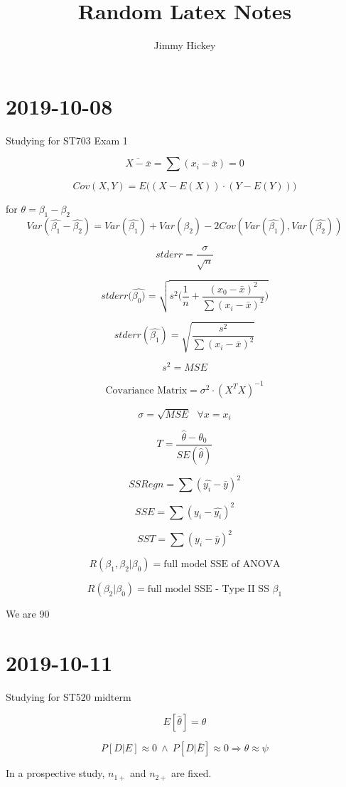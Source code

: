 \documentclass[]{article}
\title{Random Latex Notes}
\author{Jimmy Hickey}
\date{}
\begin{document}
\maketitle

\section*{2019-10-08}
Studying for ST703 Exam 1

$$
\overline{X-\bar{x}} = \sum(x_i - \bar{x}) = 0
$$

$$
Cov(X, Y) = E\Big(  (X - E(X)) \cdot (Y-E(Y)) \Big)
$$

for $\theta = \beta_1 - \beta_2$
$$
Var(\hat{\beta_1}  - \hat{\beta_2}) = Var(\hat{\beta_1}) + Var(\hat{\beta_2}) - 2 Cov( Var(\hat{\beta_1}), Var(\hat{\beta_2}))
$$


$$
stderr = \frac{ \sigma }{ \sqrt{n}  }
$$


$$
stderr(\hat{\beta_0)} = \sqrt{s^2 \Big( \frac{ 1 }{ n } + \frac{ (x_0 - \bar{x})^2 }{ \sum(x_i - \bar{x})^2  } \Big)}
$$

$$
stderr(\hat{\beta_1}) = \sqrt{\frac{ s^2 }{ \sum(x_i - \bar{x})^2 }}
$$


$$
s^2 = MSE
$$

$$
\text{Covariance Matrix} = \sigma^2 \cdot (X^T X)^{-1}
$$

$$
\sigma = \sqrt{MSE} \ \ \ \forall x = x_i
$$

$$
T = \frac{ \hat{\theta} - \theta_0 }{ SE(\hat{\theta}) }
$$


$$
SSRegn = \sum(\hat{y_i} - \bar{y})^2
$$

$$
SSE = \sum(y_i - \hat{y_i})^2
$$


$$
SST = \sum(y_i - \bar{y})^2
$$

$$
R(\beta_1, \beta_2 | \beta_0) = \text{full model SSE of ANOVA}
$$

$$
R(\beta_2 | \beta_0) = \text{full model SSE - Type II SS }  \beta_1
$$

We are 90

\section*{2019-10-11}
Studying for ST520 midterm

$$
E[\hat{\theta}] = \theta
$$

$$
P[D | E] \approx 0 \  \land \ P[D | \bar{E}] \approx 0 \Rightarrow \theta \approx \psi
$$

In a prospective study, $n_{1+}$ and $n_{2+}$ are fixed.
\end{document}
